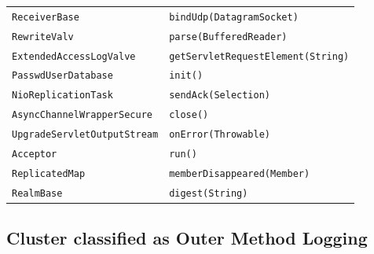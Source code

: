 \begin{center}
\begin{longtable}{ll}
\lstinline/ReceiverBase/&{\lstinline/bindUdp(DatagramSocket)/}\\
\lstinline/RewriteValv/&{\lstinline/parse(BufferedReader)/}\\
\lstinline/ExtendedAccessLogValve/&{\lstinline/getServletRequestElement(String)/}\\
\lstinline/PasswdUserDatabase/&{\lstinline/init()/}\\
\lstinline/NioReplicationTask/&{\lstinline/sendAck(Selection)/}\\
\lstinline/AsyncChannelWrapperSecure/&{\lstinline/close()/}\\
\lstinline/UpgradeServletOutputStream/&{\lstinline/onError(Throwable)/}\\
\lstinline/Acceptor/&{\lstinline/run()/}\\
\lstinline/ReplicatedMap/&{\lstinline/memberDisappeared(Member)/}\\
\lstinline/RealmBase/&{\lstinline/digest(String)/}\\

\end{longtable}
\end{center}


\subsection{Cluster classified as Outer Method Logging}


